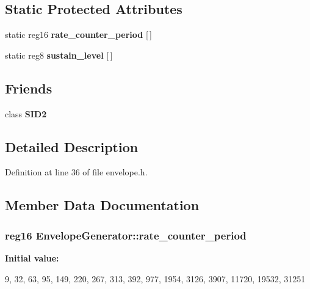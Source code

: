 \subsection*{Static Protected Attributes}
\begin{DoxyCompactItemize}
\item 
static reg16 {\bfseries rate\-\_\-counter\-\_\-period} \mbox{[}$\,$\mbox{]}
\item 
static reg8 {\bfseries sustain\-\_\-level} \mbox{[}$\,$\mbox{]}
\end{DoxyCompactItemize}
\subsection*{Friends}
\begin{DoxyCompactItemize}
\item 
\hypertarget{classEnvelopeGenerator_a906a1c7f73b30e819416802226bba3ff}{class {\bfseries S\-I\-D2}}\label{classEnvelopeGenerator_a906a1c7f73b30e819416802226bba3ff}

\end{DoxyCompactItemize}


\subsection{Detailed Description}


Definition at line 36 of file envelope.\-h.



\subsection{Member Data Documentation}
\hypertarget{classEnvelopeGenerator_a90bd81667686130fc52d8de368e26c8a}{
\subsubsection[{rate\-\_\-counter\-\_\-period}]{\setlength{\rightskip}{0pt plus 5cm}reg16 Envelope\-Generator\-::rate\-\_\-counter\-\_\-period}}\label{classEnvelopeGenerator_a90bd81667686130fc52d8de368e26c8a}
{\bfseries Initial value\-:}
\begin{DoxyCode}
 {
      9,  
     32,  
     63,  
     95,  
    149,  
    220,  
    267,  
    313,  
    392,  
    977,  
   1954,  
   3126,  
   3907,  
  11720,  
  19532,  
  31251   
}
\end{DoxyCode}


